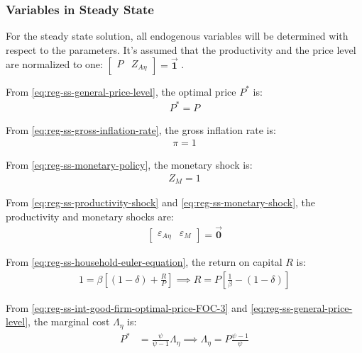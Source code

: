 \documentclass[
	thesis.tex
	]{subfiles}
\begin{document}
\subsubsection{Variables in Steady State}


For the steady state solution, all endogenous variables will be determined with respect to the parameters. It's assumed that the productivity and the price level are normalized to one: $\left[ \begin{smallmatrix} P & Z_{A\eta} \end{smallmatrix} \right] = \vec{\bm{1}}$ \footnotemark{}. 

From \ref{eq:reg-ss-general-price-level}, the optimal price $P^\ast$ is:
\begin{align}
	P^\ast = P
\end{align}

From \ref{eq:reg-ss-gross-inflation-rate}, the gross inflation rate is:
\begin{align}
	\pi = 1
\end{align}

From \ref{eq:reg-ss-monetary-policy}, the monetary shock is:
\begin{align}
	Z_{M} = 1
\end{align}

From \ref{eq:reg-ss-productivity-shock} and \ref{eq:reg-ss-monetary-shock}, the productivity and monetary shocks are:
\begin{align}
	\begin{bmatrix}
		\varepsilon_{A\eta} & \varepsilon_{M}
	\end{bmatrix} = \vec{\bm{0}}
\end{align}

From \ref{eq:reg-ss-household-euler-equation}, the return on capital $R$ is:
\begin{align}
	\label{eq:reg-ss-return-on-capital}
	1 = \beta \left[ (1-\delta) + \frac{R}{P} \right] \implies 
	R = P\left[ \frac{1}{\beta} - (1-\delta) \right]
\end{align}

From \ref{eq:reg-ss-int-good-firm-optimal-price-FOC-3} and \ref{eq:reg-ss-general-price-level}, the marginal cost $\Lambda_{\eta}$ is:
\begin{align}
	P^\ast &= \frac{\psi}{\psi-1} \Lambda_{\eta} \implies \Lambda_{\eta} = P \frac{\psi-1}{\psi} \label{eq:reg-ss-marginal-cost}
\end{align}
\end{document}
